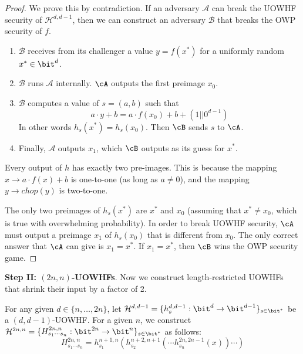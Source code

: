\begin{proof}
    We prove this by contradiction. If an adversary $\mathcal{A}$ can break the UOWHF security of $\mathcal{H}^{d, d-1}$, then we can construct an adversary $\mathcal{B}$ that breaks the OWP security of $f$. 

    \begin{enumerate}
        \item $\mathcal{B}$ receives from its challenger a value $y = f(x^*)$ for a uniformly random $x^* \in \bit^d$.
        \item $\mathcal{B}$ runs $\mathcal{A}$ internally. $\cA$ outputs the first preimage $x_0$.
        \item $\mathcal{B}$ computes a value of $s=(a,b)$ such that 
        \[a \cdot y + b = a \cdot f(x_0) + b + (1 || 0^{d-1})\] 
        In other words $h_s(x^*) = h_s(x_0)$. Then $\cB$ sends $s$ to $\cA$.
        \item Finally, $\mathcal{A}$ outputs $x_1$, which $\cB$ outputs as its guess for $x^*$. 
    \end{enumerate} 
    
    Every output of $h$ has exactly two pre-images. This is because the mapping $x \to a \cdot f(x) + b$ is one-to-one (as long as $a \neq 0$), and the mapping $y \to chop(y)$ is two-to-one.

    The only two preimages of $h_s(x^*)$ are $x^*$ and $x_0$ (assuming that $x^* \neq x_0$, which is true with overwhelming probability). In order to break UOWHF security, $\cA$ must output a preimage $x_1$ of $h_s(x_0)$ that is different from $x_0$. The only correct answer that $\cA$ can give is $x_1 = x^*$. If $x_1 = x^*$, then $\cB$ wins the OWP security game.
\end{proof}
\vspace{5mm}

\noindent\textbf{Step II: $(2n, n)$-UOWHFs}.
Now we construct length-restricted UOWHFs that shrink their input by a factor of 2.

\begin{construction}\label{construction-2}
    For any given $d \in \{n, \dots, 2n\}$, let $\mathcal{H}^{d, d-1} = \{h_s^{d, d-1}: \bit^{d}\rightarrow\bit^{d-1}\}_{s\in\bit^{*}}$ be a $(d, d-1)$-UOWHF. For a given $n$, we construct $\mathcal{H}^{2n, n} = \{H^{2n, n}_{s_1\cdots s_n}:\bit^{2n}\rightarrow\bit^{n}\}_{s \in \bit^*}$ as follows:
    \[
        H^{2n, n}_{s_1\cdots s_n}=h_{s_1}^{n+1,n}(h_{s_2}^{n+2,n+1}(\cdots h_{s_n}^{2n,2n-1}(x))\cdots)
    \]
\end{construction}

